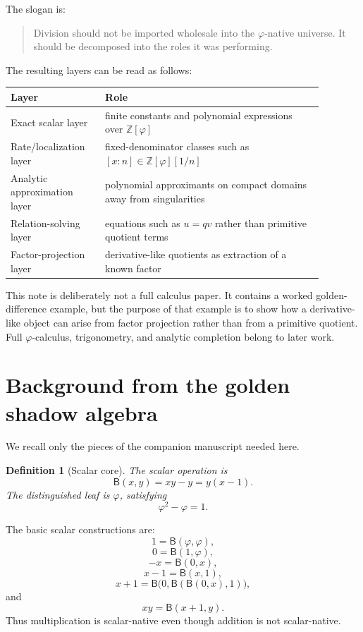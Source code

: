 \documentclass[11pt]{article}
\newtheorem{definition}{Definition}[section]
\newcommand{\B}{\mathsf{B}}
\newcommand{\ph}{\varphi}
\newcommand{\Z}{\mathbb{Z}}
\begin{document}
The slogan is:
\begin{quote}
Division should not be imported wholesale into the $\ph$-native universe.  It should be decomposed into the roles it was performing.
\end{quote}

The resulting layers can be read as follows:
\begin{center}
\begin{tabular}{p{0.26\linewidth}p{0.62\linewidth}}
\toprule
Layer & Role \\
\midrule
Exact scalar layer & finite constants and polynomial expressions over $\Z[\ph]$ \\
Rate/localization layer & fixed-denominator classes such as $[x:n]\in \Z[\ph][1/n]$ \\
Analytic approximation layer & polynomial approximants on compact domains away from singularities \\
Relation-solving layer & equations such as $u=qv$ rather than primitive quotient terms \\
Factor-projection layer & derivative-like quotients as extraction of a known factor \\
\bottomrule
\end{tabular}
\end{center}

This note is deliberately not a full calculus paper.  It contains a worked golden-difference example, but the purpose of that example is to show how a derivative-like object can arise from factor projection rather than from a primitive quotient.  Full $\ph$-calculus, trigonometry, and analytic completion belong to later work.

\section{Background from the golden shadow algebra}

We recall only the pieces of the companion manuscript needed here.

\begin{definition}[Scalar core]
The scalar operation is
\[
    \B(x,y)=xy-y=y(x-1).
\]
The distinguished leaf is $\ph$, satisfying
\[
    \ph^2-\ph=1.
\]
\end{definition}

The basic scalar constructions are:
\[
    1=\B(\ph,\ph),
\]
\[
    0=\B(1,\ph),
\]
\[
    -x=\B(0,x),
\]
\[
    x-1=\B(x,1),
\]
\[
    x+1=\B\bigl(0,\B(\B(0,x),1)\bigr),
\]
and
\[
    xy=\B(x+1,y).
\]
Thus multiplication is scalar-native even though addition is not scalar-native.
\end{document}
